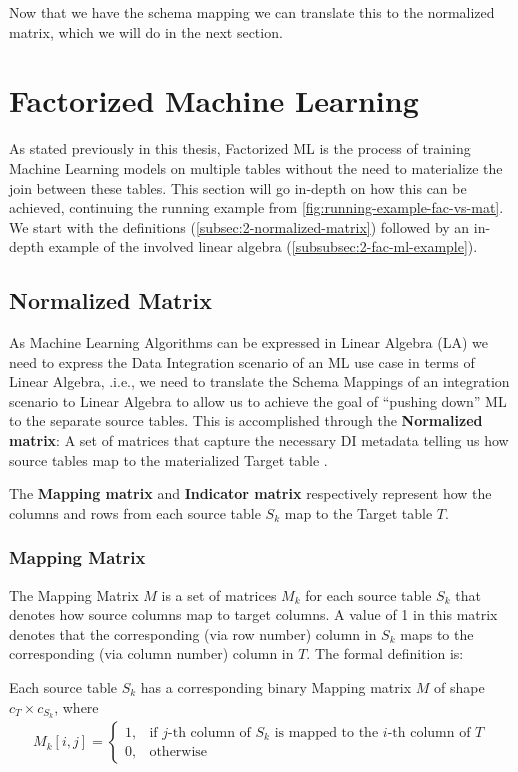 Now that we have the schema mapping we can translate this to the normalized matrix, which we will do in the next section.

\section{Factorized Machine Learning}
\label{sec:2-factorized-ml}
As stated previously in this thesis, Factorized ML is the process of training Machine Learning models on multiple tables without the need to materialize the join between these tables. This section will go in-depth on how this can be achieved, continuing the running example from \autoref{fig:running-example-fac-vs-mat}.  We start with the definitions (\autoref{subsec:2-normalized-matrix}) followed by an in-depth example of the involved linear algebra (\autoref{subsubsec:2-fac-ml-example}).

\subsection{Normalized Matrix}
\label{subsec:2-normalized-matrix}

As Machine Learning Algorithms can be expressed in Linear Algebra (LA) we need to express the Data Integration scenario of an ML use case in terms of Linear Algebra, .i.e., we need to translate the Schema Mappings of an integration scenario to Linear Algebra to allow us to achieve the goal of “pushing down” ML to the separate source tables. This is accomplished through the \textbf{Normalized matrix}: A set of matrices that capture the necessary DI metadata telling us how source tables map to the materialized Target table \cite{amalur, morpheus}.

The \textbf{Mapping matrix} and \textbf{Indicator matrix} respectively represent how the columns and rows from each source table $S_k$ map to the Target table $T$.

\subsubsection{Mapping Matrix}
The Mapping Matrix $M$ is a set of matrices $M_k$ for each source table $S_k$ that denotes how source columns map to target columns. A value of 1 in this matrix denotes that the corresponding (via row number) column in $S_k$ maps to the corresponding (via column number) column in $T$. The formal definition is:

\begin{definition}
    Each source table $S_k$ has a corresponding binary Mapping matrix $M$ of shape $c_T \times c_{S_k}$, where
    \begin{align*}
        M_k[i,j] = \begin{cases}
                       1, & \text{if $j$-th column of $S_k$ is mapped to the $i$-th column of $T$} \\
                       0, & \text{otherwise}
                   \end{cases}
    \end{align*}
\end{definition}

